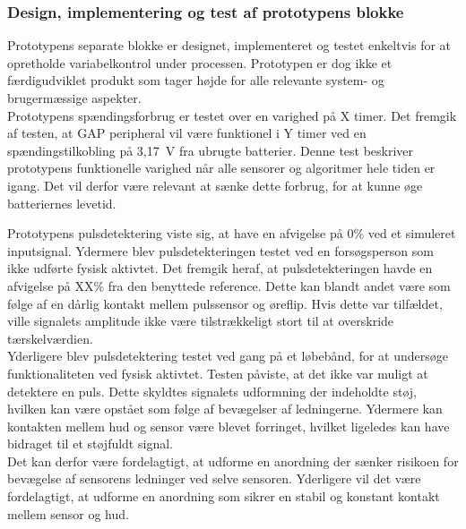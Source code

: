\subsubsection{Design, implementering og test af prototypens blokke}
Prototypens separate blokke er designet, implementeret og testet enkeltvis for at opretholde variabelkontrol under processen. Prototypen er dog ikke et færdigudviklet produkt som tager højde for alle relevante system- og brugermæssige aspekter. \\
Prototypens spændingsforbrug er testet over en varighed på X timer. Det fremgik af testen, at GAP peripheral vil være funktionel i Y timer ved en spændingstilkobling på 3,17~V fra ubrugte batterier. Denne test beskriver prototypens funktionelle varighed når alle sensorer og algoritmer hele tiden er igang. Det vil derfor være relevant at sænke dette forbrug, for at kunne øge batteriernes levetid.

Prototypens pulsdetektering viste sig, at have en afvigelse på 0\% ved et simuleret inputsignal. Ydermere blev pulsdetekteringen testet ved en forsøgsperson som ikke udførte fysisk aktivtet. Det fremgik heraf, at pulsdetekteringen havde en afvigelse på XX\% fra den benyttede reference. Dette kan blandt andet være som følge af en dårlig kontakt mellem pulssensor og øreflip. Hvis dette var tilfældet, ville signalets amplitude ikke være tilstrækkeligt stort til at overskride tærskelværdien. \\
Yderligere blev pulsdetektering testet ved gang på et løbebånd, for at undersøge funktionaliteten ved fysisk aktivtet. Testen påviste, at det ikke var muligt at detektere en puls. Dette skyldtes signalets udformning der indeholdte støj, hvilken kan være opstået som følge af bevægelser af ledningerne. Ydermere kan kontakten mellem hud og sensor være blevet forringet, hvilket ligeledes kan have bidraget til et støjfuldt signal. \\
Det kan derfor være fordelagtigt, at udforme en anordning der sænker risikoen for bevægelse af sensorens ledninger ved selve sensoren. Yderligere vil det være fordelagtigt, at udforme en anordning som sikrer en stabil og konstant kontakt mellem sensor og hud.

